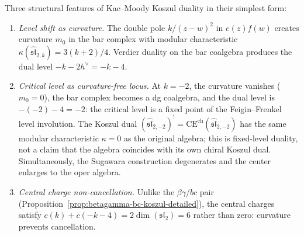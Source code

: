\begin{remark}\label{rem:sl2-portrait}
Three structural features of Kac--Moody Koszul duality in their simplest form:
\begin{enumerate}
\item \emph{Level shift as curvature.} The double pole $k/(z-w)^2$ in $e(z)f(w)$ creates curvature $m_0$ in the bar complex with modular characteristic $\kappa(\widehat{\mathfrak{sl}}_{2,k}) = 3(k+2)/4$. Verdier duality on the bar coalgebra produces the dual level $-k-2h^\vee = -k-4$.
\item \emph{Critical level as curvature-free locus.} At $k=-2$, the
 curvature vanishes ($m_0 = 0$), the bar complex becomes a dg
 coalgebra, and the dual level is $-(-2)-4 = -2$: the critical level
 is a fixed point of the Feigin--Frenkel level involution. The
 Koszul dual
 $(\widehat{\mathfrak{sl}}_{2,-2})^! = \mathrm{CE}^{\mathrm{ch}}(\widehat{\mathfrak{sl}}_{2,-2})$
 has the same modular characteristic
 $\kappa = 0$ as the original algebra; this is fixed-level duality,
 not a claim that the algebra coincides with its own chiral Koszul
 dual. Simultaneously, the Sugawara construction degenerates and the
 center enlarges to the oper algebra.
\item \emph{Central charge non-cancellation.} Unlike the $\beta\gamma$/$bc$ pair (Proposition~\ref{prop:betagamma-bc-koszul-detailed}), the central charges satisfy $c(k) + c(-k-4) = 2\dim(\mathfrak{sl}_2) = 6$ rather than zero: curvature prevents cancellation.
\end{enumerate}
\end{remark}

